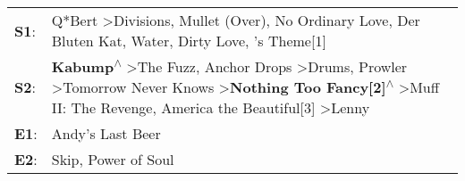 \begin{supertabular}{p{0.03\textwidth}p{0.92\textwidth}}
 \textbf{S1}:  &                                                                                                                                                                                                   Q*Bert\textsuperscript{} \textgreater \enspace Divisions\textsuperscript{}, \enspace Mullet (Over)\textsuperscript{}, \enspace No Ordinary Love\textsuperscript{}, \enspace Der Bluten Kat\textsuperscript{}, \enspace Water\textsuperscript{}, \enspace Dirty Love\textsuperscript{}, 's Theme[1]\textsuperscript{}  \enspace  \\
 \textbf{S2}:  &  \textbf{Kabump\textsuperscript{$\wedge$}} \textgreater \enspace The Fuzz\textsuperscript{}, \enspace Anchor Drops\textsuperscript{} \textgreater \enspace Drums\textsuperscript{}, \enspace Prowler\textsuperscript{} \textgreater \enspace Tomorrow Never Knows\textsuperscript{} \textgreater \enspace \textbf{Nothing Too Fancy[2]\textsuperscript{$\wedge$}} \textgreater \enspace Muff II: The Revenge\textsuperscript{}, \enspace America the Beautiful[3]\textsuperscript{} \textgreater \enspace Lenny\textsuperscript{}  \enspace  \\
 \textbf{E1}:  &                                                                                                                                                                                                                                                                                                                                                                                                                                                                                                Andy's Last Beer\textsuperscript{}  \enspace  \\
 \textbf{E2}:  &                                                                                                                                                                                                                                                                                                                                                                                                                                                                  Skip\textsuperscript{}, \enspace Power of Soul\textsuperscript{}  \enspace  \\
\end{supertabular}
